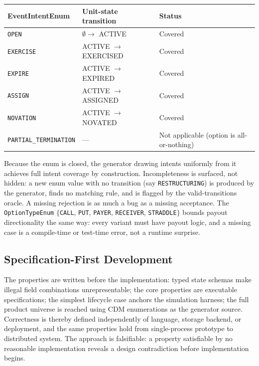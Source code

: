 \begin{center}
\begin{tabular}{lll}
\toprule
\textbf{EventIntentEnum} & \textbf{Unit-state transition} & \textbf{Status} \\
\midrule
\texttt{OPEN} & $\emptyset\to$ ACTIVE & Covered \\
\texttt{EXERCISE} & ACTIVE $\to$ EXERCISED & Covered \\
\texttt{EXPIRE} & ACTIVE $\to$ EXPIRED & Covered \\
\texttt{ASSIGN} & ACTIVE $\to$ ASSIGNED & Covered \\
\texttt{NOVATION} & ACTIVE $\to$ NOVATED & Covered \\
\texttt{PARTIAL\_TERMINATION} & --- & Not applicable (option is all-or-nothing) \\
\bottomrule
\end{tabular}
\end{center}

Because the enum is closed, the generator drawing intents uniformly from it achieves full intent coverage by construction. Incompleteness is surfaced, not hidden: a new enum value with no transition (say \texttt{RESTRUCTURING}) is produced by the generator, finds no matching rule, and is flagged by the valid-transitions oracle. A missing rejection is as much a bug as a missing acceptance. The \texttt{OptionTypeEnum} $\{$\texttt{CALL}, \texttt{PUT}, \texttt{PAYER}, \texttt{RECEIVER}, \texttt{STRADDLE}$\}$ bounds payout directionality the same way: every variant must have payout logic, and a missing case is a compile-time or test-time error, not a runtime surprise.

\subsection{Specification-First Development}
\label{sec:sec15-specfirst}

The properties are written before the implementation: typed state schemas make illegal field combinations unrepresentable; the core properties are executable specifications; the simplest lifecycle case anchors the simulation harness; the full product universe is reached using CDM enumerations as the generator source. Correctness is thereby defined independently of language, storage backend, or deployment, and the same properties hold from single-process prototype to distributed system. The approach is falsifiable: a property satisfiable by no reasonable implementation reveals a design contradiction before implementation begins.

